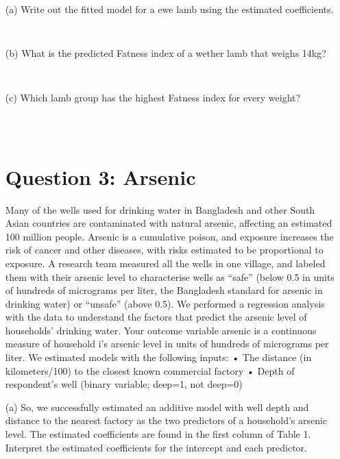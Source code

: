 \documentclass[12pt,letterpaper]{article}
\begin{document}
{		\vspace{.25cm}
		\noindent 
		
		
		\vspace{.5cm}
		
		
		\vspace{.5cm}
		\begin{enumerate}
			\item [(a)] Write out the fitted model for a ewe lamb using the estimated coefficients.
			
			
			
			\begin{verbatim}
				
			\end{verbatim}
			
			\newpage		
			\item [(b)] What is the predicted Fatness index of a wether lamb that weighs 14kg?
			
			\begin{verbatim}
				
			\end{verbatim}
			
			
			\item [(c)] Which lamb group has the highest Fatness index for every weight?
			
			
			\begin{verbatim}
				
				
			\end{verbatim}
			\vspace{.5cm}
			\section*{Question 3: Arsenic}
			Many of the wells used for drinking water in Bangladesh and other South Asian countries are
			contaminated with natural arsenic, affecting an estimated 100 million people. Arsenic is a
			cumulative poison, and exposure increases the risk of cancer and other diseases, with risks
			estimated to be proportional to exposure.
			A research team measured all the wells in one village, and labeled them with their arsenic
			level to characterise wells as “safe” (below 0.5 in units of hundreds of micrograms per liter,
			the Bangladesh standard for arsenic in drinking water) or “unsafe” (above 0.5).
			We performed a regression analysis with the data to understand the factors that predict the
			arsenic level of households’ drinking water. Your outcome variable arsenic is a continuous
			measure of household i’s arsenic level in units of hundreds of micrograms per liter.
			We estimated models with the following inputs:
			• The distance (in kilometers/100) to the closest known commercial factory
			• Depth of respondent’s well (binary variable; deep=1, not deep=0)
			\item [(a)] 
			So, we successfully estimated an additive model with well depth and distance to the
			nearest factory as the two predictors of a household’s arsenic level. The estimated
			coefficients are found in the first column of Table 1. Interpret the estimated coefficients
			for the intercept and each predictor.
			\begin{verbatim}
				

\end{verbatim}
\end{enumerate}}
\end{document}

